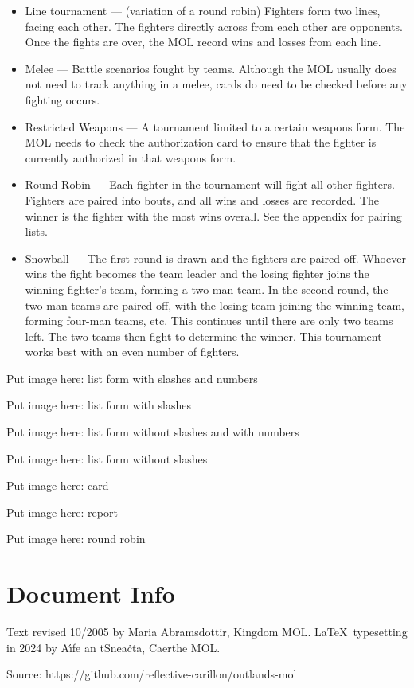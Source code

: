 \documentclass{article}
\begin{document}
\begin{itemize}
\item Line tournament --- (variation of a round robin) Fighters form two lines, facing each other. The
fighters directly across from each other are opponents. Once the fights are over, the MOL record wins
and losses from each line.

\item Melee --- Battle scenarios fought by teams. Although the MOL usually does not need to track anything
in a melee, cards do need to be checked before any fighting occurs.

\item Restricted Weapons --- A tournament limited to a certain weapons form. The MOL needs to check the
authorization card to ensure that the fighter is currently authorized in that weapons form.

\item Round Robin --- Each fighter in the tournament will fight all other fighters. Fighters are paired into
bouts, and all wins and losses are recorded. The winner is the fighter with the most wins overall. See
the appendix for pairing lists.

\item Snowball --- The first round is drawn and the fighters are paired off. Whoever wins the fight becomes
the team leader and the losing fighter joins the winning fighter’s team, forming a two-man team. In the
second round, the two-man teams are paired off, with the losing team joining the winning team,
forming four-man teams, etc. This continues until there are only two teams left. The two teams then
fight to determine the winner. This tournament works best with an even number of fighters.
\end{itemize}

Put image here: list form with slashes and numbers

Put image here: list form with slashes


Put image here: list form without slashes and with numbers

Put image here: list form without slashes

Put image here: card

Put image here: report

Put image here: round robin

\section{Document Info}

Text revised 10/2005 by Maria Abramsdottir, Kingdom MOL\@. \LaTeX\ typesetting in 2024 by A\'\i fe an tSnea\.cta, Caerthe MOL\@.

Source: https://github.com/reflective-carillon/outlands-mol
\end{document}
